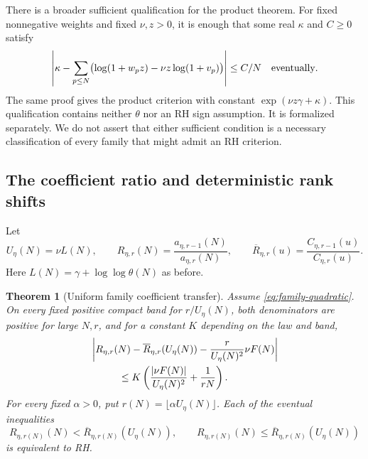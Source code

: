 \documentclass[11pt]{article}
\newtheorem{theorem}{Theorem}[section]
\theoremstyle{definition}
\begin{document}
There is a broader sufficient qualification for the product theorem.
For fixed nonnegative weights and fixed $\nu,z>0$, it is enough that
some real $\kappa$ and $C\ge0$ satisfy
\begin{equation}\label{eq:family-general-tail}
 \left|\kappa-\sum_{p\le N}
   \bigl(\log(1+w_pz)-\nu z\log(1+v_p)\bigr)\right|
 \le C/N
 \quad\hbox{eventually}.
\end{equation}
The same proof gives the product criterion with constant
$\exp(\nu z\gamma+\kappa)$. This qualification contains neither
$\theta$ nor an RH sign assumption. It is formalized separately.
We do not assert that either sufficient condition is a necessary
classification of every family that might admit an RH criterion.

\subsection{The coefficient ratio and deterministic rank shifts}
Let
\[
 U_\eta(N)=\nu L(N),\qquad
 R_{\eta,r}(N)=\frac{a_{\eta,r-1}(N)}{a_{\eta,r}(N)},\qquad
 \overline R_{\eta,r}(u)=\frac{C_{\eta,r-1}(u)}{C_{\eta,r}(u)}.
\]
Here $L(N)=\gamma+\log\log\theta(N)$ as before.

\begin{theorem}[Uniform family coefficient transfer]\label{thm:family-ratio}
Assume \eqref{eq:family-quadratic}. On every fixed positive compact
band for $r/U_\eta(N)$, both denominators are positive for large
$N,r$, and for a constant $K$ depending on the law and band,
\begin{align}
 &\left|R_{\eta,r}(N)-\overline R_{\eta,r}(U_\eta(N))
       -\frac{r}{U_\eta(N)^2}\nu F(N)\right|\notag\\
 &\hspace{1cm}\le
 K\left(\frac{|\nu F(N)|}{U_\eta(N)^2}+\frac1{rN}\right).
 \label{eq:family-linearization}
\end{align}
For every fixed $\alpha>0$, put $r(N)=\lfloor\alpha U_\eta(N)\rfloor$.
Each of the eventual inequalities
\[
 R_{\eta,r(N)}(N)<\overline R_{\eta,r(N)}(U_\eta(N)),
 \qquad
 R_{\eta,r(N)}(N)\le\overline R_{\eta,r(N)}(U_\eta(N))
\]
is equivalent to RH.
\end{theorem}
\end{document}
